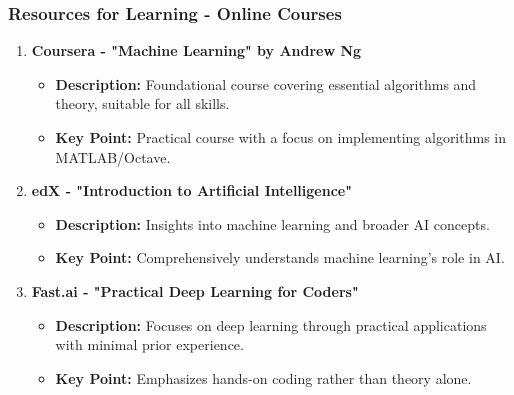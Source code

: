 \documentclass[aspectratio=169]{beamer}
\begin{document}
\begin{frame}[fragile]
    \frametitle{Resources for Learning - Online Courses}
    \begin{enumerate}
        \item \textbf{Coursera - "Machine Learning" by Andrew Ng}
        \begin{itemize}
            \item \textbf{Description:} Foundational course covering essential algorithms and theory, suitable for all skills.
            \item \textbf{Key Point:} Practical course with a focus on implementing algorithms in MATLAB/Octave.
        \end{itemize}
        
        \item \textbf{edX - "Introduction to Artificial Intelligence"}
        \begin{itemize}
            \item \textbf{Description:} Insights into machine learning and broader AI concepts.
            \item \textbf{Key Point:} Comprehensively understands machine learning's role in AI.
        \end{itemize}
        
        \item \textbf{Fast.ai - "Practical Deep Learning for Coders"}
        \begin{itemize}
            \item \textbf{Description:} Focuses on deep learning through practical applications with minimal prior experience.
            \item \textbf{Key Point:} Emphasizes hands-on coding rather than theory alone.
        \end{itemize}
    \end{enumerate}
\end{frame}
\end{document}
